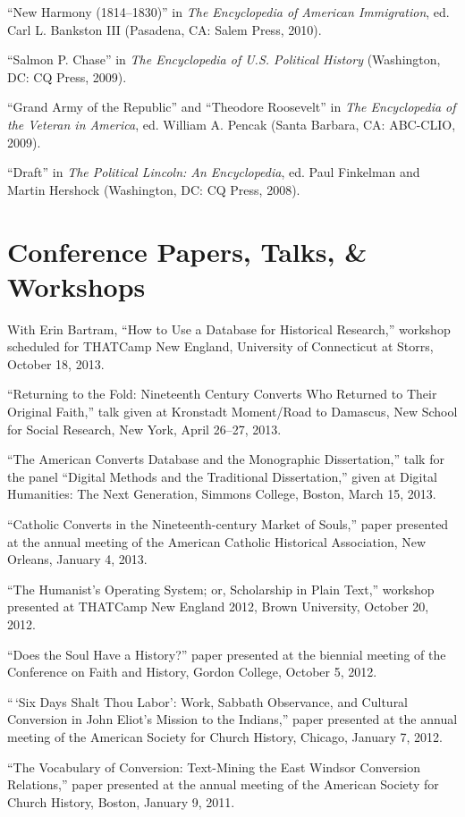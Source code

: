 \documentclass[11pt]{article}
\begin{document}
``New Harmony (1814--1830)'' in \emph{The Encyclopedia of American
Immigration}, ed. Carl L. Bankston III (Pasadena, CA: Salem Press,
2010).

``Salmon P. Chase'' in \emph{The Encyclopedia of U.S. Political History}
(Washington, DC: CQ Press, 2009).

``Grand Army of the Republic'' and ``Theodore Roosevelt'' in \emph{The
Encyclopedia of the Veteran in America}, ed. William A. Pencak (Santa
Barbara, CA: ABC-CLIO, 2009).

``Draft'' in \emph{The Political Lincoln: An Encyclopedia}, ed. Paul
Finkelman and Martin Hershock (Washington, DC: CQ Press, 2008).

\section{Conference Papers, Talks, \& Workshops}

With Erin Bartram, ``How to Use a Database for Historical
Research,'' workshop scheduled for THATCamp New England, University of 
Connecticut at Storrs, October 18, 2013.

``Returning to the Fold: Nineteenth Century Converts Who Returned to
Their Original Faith,'' talk given at Kronstadt Moment/Road to
Damascus, New School for Social Research, New York, April 26--27, 2013.

``The American Converts Database and the Monographic Dissertation,''
talk for the panel ``Digital Methods and the Traditional Dissertation,''
given at Digital Humanities: The Next Generation, Simmons College,
Boston, March 15, 2013.

``Catholic Converts in the Nineteenth-century Market of Souls,'' paper
presented at the annual meeting of the American Catholic Historical
Association, New Orleans, January 4, 2013.

``The Humanist's Operating System; or, Scholarship in Plain Text,''
workshop presented at THATCamp New England 2012, Brown University,
October 20, 2012.

``Does the Soul Have a History?'' paper presented at the biennial
meeting of the Conference on Faith and History, Gordon College, October
5, 2012.

``\,`Six Days Shalt Thou Labor': Work, Sabbath Observance, and Cultural
Conversion in John Eliot's Mission to the Indians,'' paper presented at
the annual meeting of the American Society for Church History, Chicago,
January 7, 2012.

``The Vocabulary of Conversion: Text-Mining the East Windsor Conversion
Relations,'' paper presented at the annual meeting of the American
Society for Church History, Boston, January 9, 2011.
\end{document}
